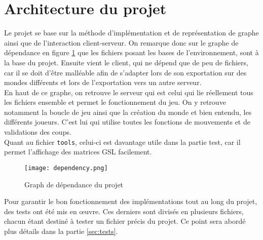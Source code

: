 \section{Architecture du projet}
\label{sec:architecture}

Le projet se base sur la méthode d'implémentation et de représentation de graphe ainsi que de l'interaction client-serveur. On remarque donc sur le graphe de dépendance en figure \ref{fig:my_label} que les fichiers posant les bases de l'environnement, sont à la base du projet. Ensuite vient le client, qui ne dépend que de peu de fichiers, car il se doit d'être malléable afin de s'adapter lors de son exportation sur des mondes différents et lors de l'exportation vers un autre serveur. \\
En haut de ce graphe, on retrouve le serveur qui est celui qui lie réellement tous les fichiers ensemble et permet le fonctionnement du jeu. On y retrouve notamment la boucle de jeu ainsi que la création du monde et bien entendu, les différents joueurs. C'est lui qui utilise toutes les fonctions de mouvements et de validations des coups. \\
Quant au fichier \texttt{tools}, celui-ci est davantage utile dans la partie test, car il permet l'affichage des matrices GSL facilement.

\medbreak

\begin{figure}[H]
    \centering
    \texttt{[image: dependency.png]}
    \caption{Graph de dépendance du projet}
    \label{fig:my_label}
\end{figure}

\medbreak

Pour garantir le bon fonctionnement des implémentations tout au long du projet, des tests ont été mis en œuvre. Ces derniers sont divisés en plusieurs fichiers, chacun étant destiné à tester un fichier précis du projet. Ce point sera abordé plus détails dans la partie \ref{sec:tests}.